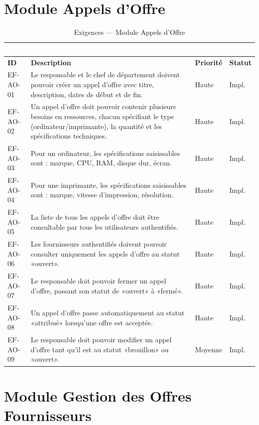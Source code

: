 \documentclass[12pt,a4paper]{report}
\begin{document}
\section{Module Appels d'Offre}

\begin{longtable}{|C{1.8cm}|L{8.5cm}|C{2cm}|C{2cm}|}
\caption{Exigences — Module Appels d'Offre} \\
\hline
{}\textcolor{white}{\textbf{ID}} & \textcolor{white}{\textbf{Description}} & \textcolor{white}{\textbf{Priorité}} & \textcolor{white}{\textbf{Statut}} \\
\hline
\endfirsthead
\hline
\textbf{ID} & \textbf{Description} & \textbf{Priorité} & \textbf{Statut} \\
\hline
\endhead
EF-AO-01 & Le responsable et le chef de département doivent pouvoir créer un appel d'offre avec titre, description, dates de début et de fin. & Haute & Impl. \\
\hline
EF-AO-02 & Un appel d'offre doit pouvoir contenir plusieurs besoins en ressources, chacun spécifiant le type (ordinateur/imprimante), la quantité et les spécifications techniques. & Haute & Impl. \\
\hline
EF-AO-03 & Pour un ordinateur, les spécifications saisissables sont : marque, CPU, RAM, disque dur, écran. & Haute & Impl. \\
\hline
EF-AO-04 & Pour une imprimante, les spécifications saisissables sont : marque, vitesse d'impression, résolution. & Haute & Impl. \\
\hline
EF-AO-05 & La liste de tous les appels d'offre doit être consultable par tous les utilisateurs authentifiés. & Haute & Impl. \\
\hline
EF-AO-06 & Les fournisseurs authentifiés doivent pouvoir consulter uniquement les appels d'offre au statut «ouvert». & Haute & Impl. \\
\hline
EF-AO-07 & Le responsable doit pouvoir fermer un appel d'offre, passant son statut de «ouvert» à «fermé». & Haute & Impl. \\
\hline
EF-AO-08 & Un appel d'offre passe automatiquement au statut «attribué» lorsqu'une offre est acceptée. & Haute & Impl. \\
\hline
EF-AO-09 & Le responsable doit pouvoir modifier un appel d'offre tant qu'il est au statut «brouillon» ou «ouvert». & Moyenne & Impl. \\
\hline
\end{longtable}

\section{Module Gestion des Offres Fournisseurs}
\end{document}
